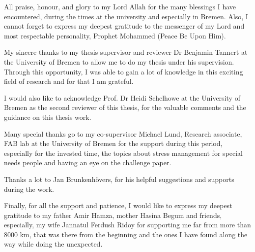 \begin{acknowledgements}

All praise, honour, and glory to my Lord Allah for the many blessings I have encountered, during the times at the university and especially in Bremen. Also, I cannot
forget to express my deepest gratitude to the messenger of my Lord and most
respectable personality, Prophet Mohammed (Peace Be Upon Him).

My sincere thanks to my thesis supervisor and reviewer Dr Benjamin Tannert at the University
of Bremen to allow me to do my thesis under his supervision. Through
this opportunity, I was able to gain a lot of knowledge in this exciting field of research and for that I am grateful.

I would also like to acknowledge Prof. Dr Heidi Schelhowe at the University of Bremen
as the second reviewer of this thesis, for the valuable comments and the guidance on this thesis work.

Many special thanks go to my co-supervisor Michael Lund, Research associate, FAB lab at the University of Bremen for the support during this period, especially for the invested time, the topics about stress management for special needs people and having an eye on the challenge paper. 

Thanks a lot to Jan Brunkenhövers, for his helpful suggestions and supports during the work.

Finally, for all the support and patience, I would like to express my deepest gratitude to my father Amir Hamza, mother Hasina Begum and friends, especially, my wife Jannatul Ferdush Ridoy for supporting me far from more than 8000 km, that was there from the beginning and the ones I have found along the way while doing the unexpected.
\end{acknowledgements}
